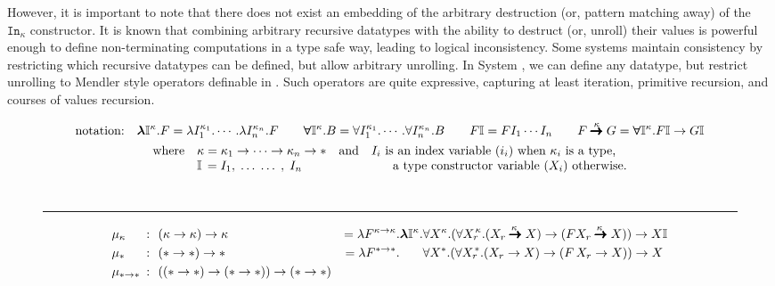 However, it is important to note that there does not exist an embedding of the
arbitrary destruction (or, pattern matching away) of the $\mathtt{In}_\kappa$
constructor. It is known that combining arbitrary recursive datatypes with
the ability to destruct (or, unroll) their values
is powerful enough to define non-terminating computations in a type safe way,
leading to logical inconsistency. Some systems maintain consistency by restricting
which recursive datatypes can be defined, but allow arbitrary unrolling. In System
\Fi, we can define any datatype, but restrict unrolling to Mendler style operators
definable in \Fi. Such operators are quite expressive, capturing at least
iteration, primitive recursion, and courses of values recursion.


\begin{figure*}
\begin{multline*} \text{notation:}\quad
   \boldsymbol{\lambda}\mathbb{I}^\kappa.F =
	\lambda I_1^{\kappa_1}.\cdots.\lambda I_n^{\kappa_n}.F \qquad
   \boldsymbol{\forall}\mathbb{I}^\kappa.B =
	\forall I_1^{\kappa_1}.\cdots.\forall I_n^{\kappa_n}.B \qquad
   F\mathbb{I} = F I_1 \cdots I_n \qquad
   F \stackrel{\kappa}{\pmb{\pmb{->}}} G =
	\boldsymbol{\forall}\mathbb{I}^\kappa.F\mathbb{I} -> G\mathbb{I} \\
\begin{array}{lll}
\text{where}
 	& \kappa = \kappa_1 -> \cdots -> \kappa_n -> * & \text{and} ~~~
 	\text{$I_i$ is an index variable ($i_i$) when $\kappa_i$ is a type,}
 		\\
 	& \mathbb{I}\,=I_1,\;\dots\;\dots\;,\;I_n& \qquad~\qquad
 	\text{a type constructor variable ($X_i$) otherwise.}
\end{array}
\end{multline*} ~ \vspace*{-5pt}
\hrule  \vspace*{-2pt}
\begin{align*}
&\mu_\kappa &\!\!\!\!\!~:~~& (\kappa -> \kappa) -> \kappa
  \qquad\qquad\qquad\qquad\quad
  = \l F^{\kappa -> \kappa}.\boldsymbol{\l}\mathbb{I}^\kappa.
  \forall X^\kappa.
  (\forall {X_r}^{\!\!\kappa}.
  	(X_r \stackrel{\kappa\;}{\pmb{\pmb{->}}} X) ->
	(F X_r \stackrel{\kappa\;}{\pmb{\pmb{->}}} X)) -> X\mathbb{I} \\
&\mu_{*} &\!\!\!\!\!~:~~& (* -> *) -> * 
 \qquad\qquad\qquad\qquad\quad~
 = \l F^{* -> *}.\phantom{\boldsymbol{\l}\mathbb{I}^\kappa.}
 \forall X^{*}.(\forall {X_r}^{\!\!*}.(X_r -> X) -> (F\,X_r -> X)) -> X \\
&\mu_{*-> *} &\!\!\!\!\!~:~~& ((* -> *) -> (* -> *)) -> (* -> *) \\

\end{align*}
\end{figure*}
